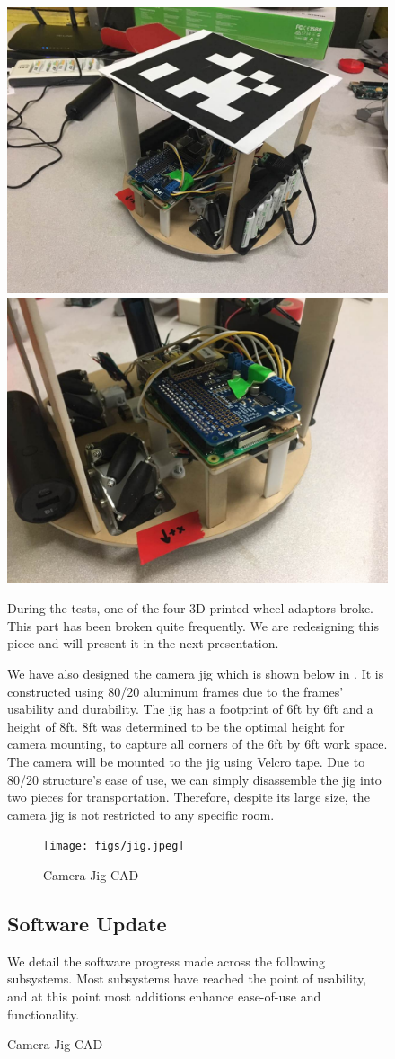 \begin{figure}[h!]
\centering
\includegraphics[width=0.49\columnwidth]{figs/robot1.jpeg}
\includegraphics[width=0.49\columnwidth]{figs/robot2.jpeg}
\caption{Prototype Overview}
\label{fig:em1}

During the tests, one of the four 3D printed wheel adaptors broke. This part has been broken quite frequently. We are redesigning this piece and will present it in the next presentation. 

We have also designed the camera jig which is shown below in . It is constructed using 80/20 aluminum frames due to the frames’ usability and durability. The jig has a footprint of 6ft by 6ft and a height of 8ft. 8ft was determined to be the optimal height for camera mounting, to capture all corners of the 6ft by 6ft work space. The camera will be mounted to the jig using Velcro tape. Due to 80/20 structure’s ease of use, we can simply disassemble the jig into two pieces for transportation. Therefore, despite its large size, the camera jig is not restricted to any specific room.

\begin{figure}[h!]
\centering
\texttt{[image: figs/jig.jpeg]}
\caption{Camera Jig CAD}
\label{fig:em2}
\end{figure}

\subsection{Software Update}
\label{sec:software_progress}
We detail the software progress made across the following subsystems. Most subsystems have reached the point of usability, and at this point most additions enhance ease-of-use and functionality.



\end{figure}
